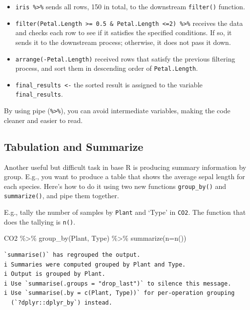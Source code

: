 \documentclass[
  letterpaper,
  DIV=11,
  numbers=noendperiod]{scrreprt}
\newenvironment{Shaded}{\begin{snugshade}}{\end{snugshade}}
\newcommand{\AttributeTok}[1]{\textcolor[rgb]{0.40,0.45,0.13}{#1}}
\newcommand{\FunctionTok}[1]{\textcolor[rgb]{0.28,0.35,0.67}{#1}}
\newcommand{\NormalTok}[1]{\textcolor[rgb]{0.00,0.23,0.31}{#1}}
\newcommand{\SpecialCharTok}[1]{\textcolor[rgb]{0.37,0.37,0.37}{#1}}
\begin{document}
\begin{itemize}
\item
  \texttt{iris\ \%\textgreater{}\%} sends all rows, 150 in total, to the
  downstream \texttt{filter()} function.
\item
  \texttt{filter(Petal.Length\ \textgreater{}=\ 0.5\ \&\ Petal.Length\ \textless{}=2)\ \%\textgreater{}\%}
  receives the data and checks each row to see if it satisfies the
  specified conditions. If so, it sends it to the downstream process;
  otherwise, it does not pass it down.
\item
  \texttt{arrange(-Petal.Length)} received rows that satisfy the
  previous filtering process, and sort them in descending order of
  \texttt{Petal.Length}.
\item
  \texttt{final\_results\ \textless{}-} the sorted result is assigned to
  the variable \texttt{final\_results}.
\end{itemize}

By using pipe (\texttt{\%\textgreater{}\%}), you can avoid intermediate
variables, making the code cleaner and easier to read.

\subsection{Tabulation and Summarize}\label{sec-tidyverse-tabulation}

Another useful but difficult task in base R is producing summary
information by group. E.g., you want to produce a table that shows the
average sepal length for each species. Here's how to do it using two new
functions \texttt{group\_by()} and \texttt{summarize()}, and pipe them
together.

E.g., tally the number of samples by \texttt{Plant} and `Type' in
\texttt{CO2}. The function that does the tallying is \texttt{n()}.

\begin{Shaded}
\begin{Highlighting}[]
\NormalTok{CO2 }\SpecialCharTok{\%\textgreater{}\%}
  \FunctionTok{group\_by}\NormalTok{(Plant, Type) }\SpecialCharTok{\%\textgreater{}\%}
  \FunctionTok{summarize}\NormalTok{(}\AttributeTok{n=}\FunctionTok{n}\NormalTok{())}
\end{Highlighting}
\end{Shaded}

\begin{verbatim}
`summarise()` has regrouped the output.
i Summaries were computed grouped by Plant and Type.
i Output is grouped by Plant.
i Use `summarise(.groups = "drop_last")` to silence this message.
i Use `summarise(.by = c(Plant, Type))` for per-operation grouping
  (`?dplyr::dplyr_by`) instead.
\end{verbatim}
\end{document}
